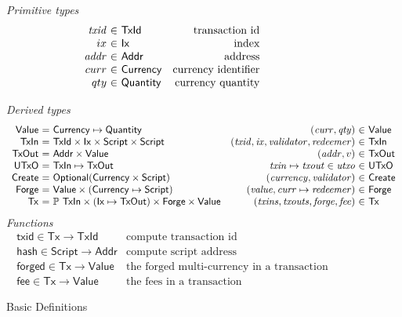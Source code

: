 \documentclass[11pt,a4paper]{article}
\newcommand{\powerset}[1]{\mathbb{P}~#1}
\newcommand{\var}[1]{\mathit{#1}}
\newcommand{\fun}[1]{\mathsf{#1}}
\newcommand{\type}[1]{\mathsf{#1}}
\begin{document}
\begin{figure}

\emph{Primitive types}
%
\begin{equation*}
\begin{array}{r@{~\in~}lr}
  \var{txid}
& \type{TxId}
& \text{transaction id}
\\
  ix
& \type{Ix}
& \text{index}
\\
  \var{addr}
& \type{Addr}
& \text{address}
\\
  curr
& \type{Currency}
& \text{currency identifier}
\\
  qty
& \type{Quantity}
& \text{currency quantity}
\end{array}
\end{equation*}

%
\emph{Derived types}
%
\begin{equation*}
\begin{array}{r@{~=~}lc@{}r@{~\in~}l}
  \type{Value}
& \type{Currency} \mapsto \type{Quantity}
&
& (\var{curr}, \var{qty})
& \type{Value}
\\
  \type{TxIn}
& \type{TxId} \times \type{Ix} \times \type{Script} \times \type{Script}
&
& (\var{txid}, \var{ix}, \var{validator}, \var{redeemer})
& \type{TxIn}
\\
  \type{TxOut}
& \type{Addr} \times \type{Value}
&
& (\var{addr}, v)
& \type{TxOut}
\\
  \type{UTxO}
& \type{TxIn} \mapsto \type{TxOut}
&
& \var{txin} \mapsto \var{txout} \in \var{utxo}
& \type{UTxO}
\\
  \type{Create}
& \type{Optional} (\type{Currency} \times \type{Script})
&
& (\var{currency}, \var{validator})
& \type{Create}
\\
  \type{Forge}
& \type{Value} \times (\type{Currency} \mapsto \type{Script})
&
& (\var{value}, \var{curr} \mapsto \var{redeemer})
& \type{Forge}
\\
  \type{Tx}
& \powerset{\type{TxIn}} \times (\type{Ix} \mapsto
    \type{TxOut}) \times \type{Forge} \times \type{Value}
&
& (\var{txins}, \var{txouts}, \var{forge}, \var{fee})
& \type{Tx}
\end{array}
\end{equation*}
%
\emph{Functions}
%
\begin{equation*}
\begin{array}{lr}
  \fun{txid} \in \type{Tx} \to \type{TxId}
& \text{compute transaction id}
\\
  \fun{hash} \in \type{Script} \to \type{Addr}
& \text{compute script address}
\\
  \fun{forged} \in \type{Tx} \to \type{Value}
& \text{the forged multi-currency in a transaction}
\\
  \fun{fee} \in \type{Tx} \to \type{Value}
& \text{the fees in a transaction}
\end{array}
\end{equation*}

\caption{Basic Definitions}
\label{fig:basic_definitions}
\end{figure}
\end{document}
